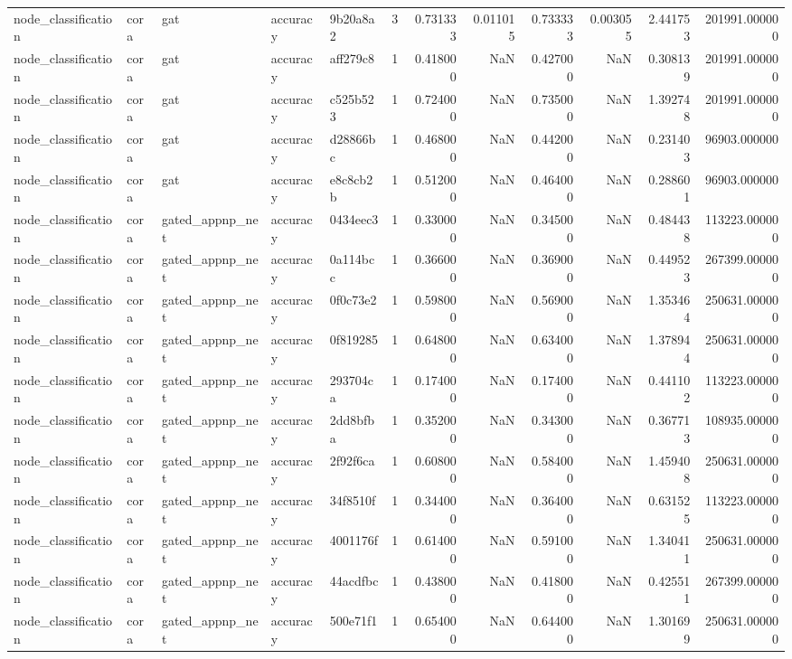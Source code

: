 \begin{tabular}{lllllrrrrrrr}
node_classification & cora & gat & accuracy & 9b20a8a2 & 3 & 0.731333 & 0.011015 & 0.733333 & 0.003055 & 2.441753 & 201991.000000 \\
node_classification & cora & gat & accuracy & aff279c8 & 1 & 0.418000 & NaN & 0.427000 & NaN & 0.308139 & 201991.000000 \\
node_classification & cora & gat & accuracy & c525b523 & 1 & 0.724000 & NaN & 0.735000 & NaN & 1.392748 & 201991.000000 \\
node_classification & cora & gat & accuracy & d28866bc & 1 & 0.468000 & NaN & 0.442000 & NaN & 0.231403 & 96903.000000 \\
node_classification & cora & gat & accuracy & e8c8cb2b & 1 & 0.512000 & NaN & 0.464000 & NaN & 0.288601 & 96903.000000 \\
node_classification & cora & gated_appnp_net & accuracy & 0434eec3 & 1 & 0.330000 & NaN & 0.345000 & NaN & 0.484438 & 113223.000000 \\
node_classification & cora & gated_appnp_net & accuracy & 0a114bcc & 1 & 0.366000 & NaN & 0.369000 & NaN & 0.449523 & 267399.000000 \\
node_classification & cora & gated_appnp_net & accuracy & 0f0c73e2 & 1 & 0.598000 & NaN & 0.569000 & NaN & 1.353464 & 250631.000000 \\
node_classification & cora & gated_appnp_net & accuracy & 0f819285 & 1 & 0.648000 & NaN & 0.634000 & NaN & 1.378944 & 250631.000000 \\
node_classification & cora & gated_appnp_net & accuracy & 293704ca & 1 & 0.174000 & NaN & 0.174000 & NaN & 0.441102 & 113223.000000 \\
node_classification & cora & gated_appnp_net & accuracy & 2dd8bfba & 1 & 0.352000 & NaN & 0.343000 & NaN & 0.367713 & 108935.000000 \\
node_classification & cora & gated_appnp_net & accuracy & 2f92f6ca & 1 & 0.608000 & NaN & 0.584000 & NaN & 1.459408 & 250631.000000 \\
node_classification & cora & gated_appnp_net & accuracy & 34f8510f & 1 & 0.344000 & NaN & 0.364000 & NaN & 0.631525 & 113223.000000 \\
node_classification & cora & gated_appnp_net & accuracy & 4001176f & 1 & 0.614000 & NaN & 0.591000 & NaN & 1.340411 & 250631.000000 \\
node_classification & cora & gated_appnp_net & accuracy & 44acdfbc & 1 & 0.438000 & NaN & 0.418000 & NaN & 0.425511 & 267399.000000 \\
node_classification & cora & gated_appnp_net & accuracy & 500e71f1 & 1 & 0.654000 & NaN & 0.644000 & NaN & 1.301699 & 250631.000000 \\

\end{tabular}
